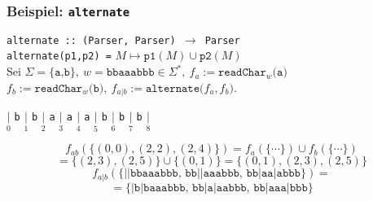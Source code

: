 \documentclass{beamer}
\begin{document}
    \begin{frame}[t]
        \frametitle{\textbf{Beispiel:} \texttt{alternate}}
        \texttt{alternate ::\ (Parser, Parser) $\to$ Parser}\\
        \texttt{alternate(p1,p2) =} $M \mapsto \texttt{p1}(M) \cup \texttt{p2}(M)$\\[10pt]
        Sei $\Sigma = \{\texttt{a,b}\},\ w = \texttt{bbaaabbb} \in \Sigma^*,\ f_a := \texttt{readChar$_w$(a)}$\\
        $f_b := \texttt{readChar$_w$(b)},\ f_{a|b} := \texttt{alternate($f_a,f_b$)}$.\\
        \begin{center}
            $\underset{0}{|}$
                {\Large\texttt{b}}
            $\underset{1}{|}$
                {\Large\texttt{b}}
            $\underset{2}{|}$
                {\Large\texttt{a}}
            $\underset{3}{|}$
                {\Large\texttt{a}}
            $\underset{4}{|}$
                {\Large\texttt{a}}
            $\underset{5}{|}$
                {\Large\texttt{b}}
            $\underset{6}{|}$
                {\Large\texttt{b}}
            $\underset{7}{|}$
                {\Large\texttt{b}}
            $\underset{8}{|}$
        \end{center}
        \pause
        $$
            f_{ab}(\{(0,0), (2,2), (2,4)\})
            = f_a(\{\cdots\}) \cup f_b(\{\cdots\})
        $$$$
            = \{(2,3),(2,5)\} \cup \{(0,1)\}
            = \{(0,1),(2,3),(2,5)\}
        $$
        \pause
        $$
            f_{a|b}(\{\texttt{||bbaaabbb, bb||aaabbb, bb|aa|abbb}\}) = 
        $$$$
            = \{\texttt{|b|baaabbb, bb|a|aabbb, bb|aaa|bbb}\}
        $$
    \end{frame}

\end{document}
